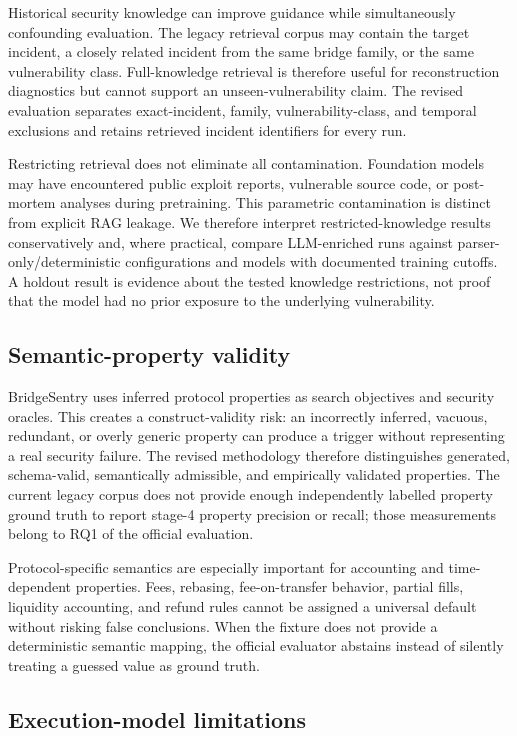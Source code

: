Historical security knowledge can improve guidance while simultaneously confounding evaluation. The legacy retrieval corpus may contain the target incident, a closely related incident from the same bridge family, or the same vulnerability class. Full-knowledge retrieval is therefore useful for reconstruction diagnostics but cannot support an unseen-vulnerability claim. The revised evaluation separates exact-incident, family, vulnerability-class, and temporal exclusions and retains retrieved incident identifiers for every run.

Restricting retrieval does not eliminate all contamination. Foundation models may have encountered public exploit reports, vulnerable source code, or post-mortem analyses during pretraining. This parametric contamination is distinct from explicit RAG leakage. We therefore interpret restricted-knowledge results conservatively and, where practical, compare LLM-enriched runs against parser-only/deterministic configurations and models with documented training cutoffs. A holdout result is evidence about the tested knowledge restrictions, not proof that the model had no prior exposure to the underlying vulnerability.

\subsection{Semantic-property validity}

BridgeSentry uses inferred protocol properties as search objectives and security oracles. This creates a construct-validity risk: an incorrectly inferred, vacuous, redundant, or overly generic property can produce a trigger without representing a real security failure. The revised methodology therefore distinguishes generated, schema-valid, semantically admissible, and empirically validated properties. The current legacy corpus does not provide enough independently labelled property ground truth to report stage-4 property precision or recall; those measurements belong to RQ1 of the official evaluation.

Protocol-specific semantics are especially important for accounting and time-dependent properties. Fees, rebasing, fee-on-transfer behavior, partial fills, liquidity accounting, and refund rules cannot be assigned a universal default without risking false conclusions. When the fixture does not provide a deterministic semantic mapping, the official evaluator abstains instead of silently treating a guessed value as ground truth.

\subsection{Execution-model limitations}

